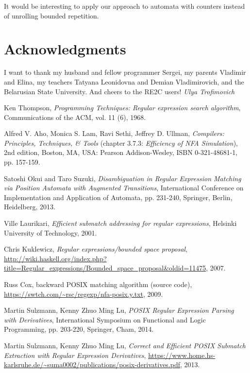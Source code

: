 \documentclass[AMA,STIX1COL]{WileyNJD-v2}
\begin{document}
It would be interesting to apply our approach to automata with counters
instead of unrolling bounded repetition.


\section*{Acknowledgments}

I want to thank my husband and fellow programmer Sergei,
my parents Vladimir and Elina, my teachers Tatyana Leonidovna and Demian Vladimirovich, and the Belarusian State University.
And cheers to the RE2C users!
\null\hfill\textit{Ulya Trofimovich}


\begin{thebibliography}{99}

    Ken Thompson,
    \textit{Programming Techniques: Regular expression search algorithm},
    Communications of the ACM,
    vol. 11 (6),
    1968.

    Alfred V. Aho, Monica S. Lam, Ravi Sethi, Jeffrey D. Ullman,
    \textit{Compilers: Principles, Techniques, \& Tools} (chapter 3.7.3: \textit{Efficiency of NFA Simulation}),
    2nd edition,
    Boston, MA, USA: Pearson Addison-Wesley,
    ISBN 0-321-48681-1,
    pp. 157-159.

    Satoshi Okui and Taro Suzuki,
    \textit{Disambiguation in Regular Expression Matching via Position Automata with Augmented Transitions},
    International Conference on Implementation and Application of Automata, pp. 231-240, Springer, Berlin, Heidelberg,
    2013.

    Ville Laurikari,
    \textit{Efficient submatch addressing for regular expressions},
    Helsinki University of Technology,
    2001.

    Chris Kuklewicz,
    \textit{Regular expressions/bounded space proposal},
    \url{http://wiki.haskell.org/index.php?title=Regular_expressions/Bounded_space_proposal&oldid=11475},
    2007.

    Russ Cox,
    backward POSIX matching algorithm (source code),
    \url{https://swtch.com/~rsc/regexp/nfa-posix.y.txt},
    2009.

    Martin Sulzmann, Kenny Zhuo Ming Lu,
    \textit{POSIX Regular Expression Parsing with Derivatives},
    International Symposium on Functional and Logic Programming, pp. 203-220, Springer, Cham,
    2014.

    Martin Sulzmann, Kenny Zhuo Ming Lu,
    \textit{Correct and Efficient POSIX Submatch Extraction with Regular Expression Derivatives},
    \url{https://www.home.hs-karlsruhe.de/~suma0002/publications/posix-derivatives.pdf},
    2013.


\end{thebibliography}
\end{document}
